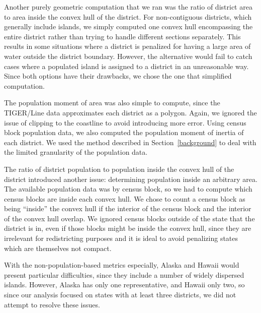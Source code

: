 \documentclass[12pt]{article}
\begin{document}
  Another purely geometric computation that we ran was the ratio of district area to area inside the convex hull of the district. For non-contiguous districts, which generally include islands, we simply computed one convex hull encompassing the entire district rather than trying to handle different sections separately. This results in some situations where a district is penalized for having a large area of water outside the district boundary. However, the alternative would fail to catch cases where a populated island is assigned to a district in an unreasonable way. Since both options have their drawbacks, we chose the one that simplified computation.

  The population moment of area was also simple to compute, since the TIGER/Line data approximates each district as a polygon.  Again, we ignored the issue of clipping to the coastline to avoid introducing more error.  Using census block population data, we also computed the population moment of inertia of each district.  We used the method described in Section~\ref{background} to deal with the limited granularity of the population data.

  The ratio of district population to population inside the convex hull of the district introduced another issue: determining population inside an arbitrary area. The available population data was by census block, so we had to compute which census blocks are inside each convex hull. We chose to count a census block as being ``inside'' the convex hull if the interior of the census block and the interior of the convex hull overlap. We ignored census blocks outside of the state that the district is in, even if those blocks might be inside the convex hull, since they are irrelevant for redistricting purposes and it is ideal to avoid penalizing states which are themselves not compact.


  With the non-population-based metrics especially, Alaska and Hawaii would present particular difficulties, since they include a number of widely dispersed islands.  However, Alaska has only one representative, and Hawaii only two, so since our analysis focused on states with at least three districts, we did not attempt to resolve these issues.
\end{document}

